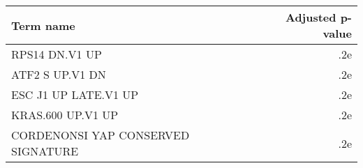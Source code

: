 \begin{tabular}{lr}
\toprule
                         Term name &  Adjusted p-value \\
\midrule
                    RPS14 DN.V1 UP &               .2e \\
                   ATF2 S UP.V1 DN &               .2e \\
              ESC J1 UP LATE.V1 UP &               .2e \\
                 KRAS.600 UP.V1 UP &               .2e \\
CORDENONSI YAP CONSERVED SIGNATURE &               .2e \\
\bottomrule
\end{tabular}
